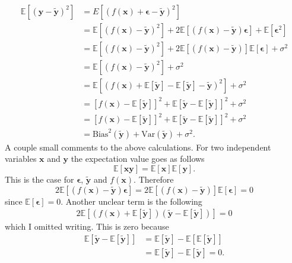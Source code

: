 \documentclass[uio,jmp,amsmath,amssymb,reprint,nofootinbib]{revtex4-1}
\numberwithin{equation}{section}
\begin{document}
\begin{align*}
\mathbb{E}[(\bm{y}-\bm{\tilde{y}})^2]& = E[(f(\bm{x})+\bm{\epsilon}-\bm{\tilde{y}})^2] \\
&= \mathbb{E}[(f(\bm{x})-\bm{\tilde{y}})^2]+2\mathbb{E}[(f(\bm{x})-\bm{\tilde{y}})\bm{\epsilon}]+\mathbb{E}[\bm{\epsilon}^2]\\
&= \mathbb{E}[(f(\bm{x})-\bm{\tilde{y}})^2]+2\mathbb{E}[(f(\bm{x})-\bm{\tilde{y}})]\mathbb{E}[\bm{\epsilon}]+\sigma^2 \\
&= \mathbb{E}[(f(\bm{x})-\bm{\tilde{y}})^2] + \sigma^2 \\
&= \mathbb{E}[(f(\bm{x}) + \mathbb{E}[\bm{\tilde{y}}] - \mathbb{E}[\bm{\tilde{y}}] - \bm{\tilde{y}})^2] + \sigma^2\\
&= \left[f(\bm{x}) - \mathbb{E}[\bm{\tilde{y}}] \right]^2 + \mathbb{E}\left[\bm{\tilde{y}} - \mathbb{E}[\bm{\tilde{y}}] \right]^2 + \sigma^2\\
&= \left[f(\bm{x}) - \mathbb{E}[\bm{\tilde{y}}] \right]^2 + \mathbb{E}\left[\bm{\tilde{y}} - \mathbb{E}[\bm{\tilde{y}}] \right]^2 + \sigma^2\\
&= \text{Bias}^2(\bm{\tilde{y}}) + \text{Var}(\bm{\tilde{y}}) +  \sigma^2.
\end{align*}
A couple small comments to the above calculations. For two independent variables \(\bm{x}\) and \(\bm{y}\) the expectation value goes as follows
\begin{equation}
\mathbb{E}[\bm{xy}] = \mathbb{E}[\bm{x}]\mathbb{E}[\bm{y}].
\end{equation}
This is the case for \(\bm{\epsilon}\), \(\bm{\tilde{y}}\) and \(f(\bm{x})\). Therefore
\begin{equation}
2\mathbb{E}[(f(\bm{x})-\bm{\tilde{y}})\bm{\epsilon}] = 2\mathbb{E}[(f(\bm{x})-\bm{\tilde{y}})]\mathbb{E}[\bm{\epsilon}] = 0
\end{equation}
since \(\mathbb{E}[\bm{\epsilon}] = 0\). Another unclear term is the following
\begin{align}
2\mathbb{E}\left[ \left(f(\bm{x}) + \mathbb{E}[\bm{\tilde{y}}]\right)\left( \bm{\tilde{y}} - \mathbb{E}[\bm{\tilde{y}}]\right) \right] = 0
\end{align}
which I omitted writing. This is zero because
\begin{align}
\mathbb{E}\left[ \bm{\tilde{y}} - \mathbb{E}[\bm{\tilde{y}}]\right] &= \mathbb{E}[\bm{\tilde{y}}] - \mathbb{E}[\mathbb{E}[\bm{\tilde{y}}]]\\
&= \mathbb{E}[\bm{\tilde{y}}] - \mathbb{E}[\bm{\tilde{y}}] = 0.
\end{align}



\end{document}
